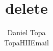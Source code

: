 \documentclass[10pt, oneside]{article}
\title{delete}
\author{Daniel Topa\\TopaHIIEmail}
\affil{\missiontech}
\begin{document}
\maketitle
\tableofcontents

	
	

\appendix

% 

\nocite{*}
\printbibliography
\end{document}
